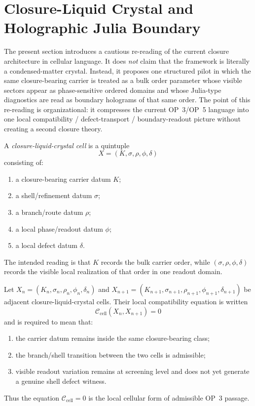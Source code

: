\section{Closure-Liquid Crystal and Holographic Julia Boundary}
\label{sec:closure-liquid-crystal-holographic-julia-boundary}

The present section introduces a cautious re-reading of the current closure architecture in cellular language. It does \emph{not} claim that the framework is literally a condensed-matter crystal. Instead, it proposes one structured pilot in which the same closure-bearing carrier is treated as a bulk order parameter whose visible sectors appear as phase-sensitive ordered domains and whose Julia-type diagnostics are read as boundary holograms of that same order. The point of this re-reading is organizational: it compresses the current OP~3/OP~5 language into one local compatibility / defect-transport / boundary-readout picture without creating a second closure theory.

\begin{definition}
\label{def:closure-liquid-crystal-cell}
A \emph{closure-liquid-crystal cell} is a quintuple
\[
 X=(K,\sigma,\rho,\phi,\delta)
\]
consisting of:
\begin{enumerate}[leftmargin=2em,label=(\roman*)]
 \item a closure-bearing carrier datum $K$;
 \item a shell/refinement datum $\sigma$;
 \item a branch/route datum $\rho$;
 \item a local phase/readout datum $\phi$;
 \item a local defect datum $\delta$.
\end{enumerate}
The intended reading is that $K$ records the bulk carrier order, while $(\sigma,\rho,\phi,\delta)$ records the visible local realization of that order in one readout domain.
\end{definition}

\begin{definition}
\label{def:local-cell-compatibility-equation}
Let $X_n=(K_n,\sigma_n,\rho_n,\phi_n,\delta_n)$ and
$X_{n+1}=(K_{n+1},\sigma_{n+1},\rho_{n+1},\phi_{n+1},\delta_{n+1})$
be adjacent closure-liquid-crystal cells. Their local compatibility equation is written
\[
 \mathcal C_{\mathrm{cell}}(X_n,X_{n+1})=0
\]
and is required to mean that:
\begin{enumerate}[leftmargin=2em,label=(\roman*)]
 \item the carrier datum remains inside the same closure-bearing class;
 \item the branch/shell transition between the two cells is admissible;
 \item visible readout variation remains at screening level and does not yet generate a genuine shell defect witness.
\end{enumerate}
Thus the equation $\mathcal C_{\mathrm{cell}}=0$ is the local cellular form of admissible OP~3 passage.
\end{definition}

